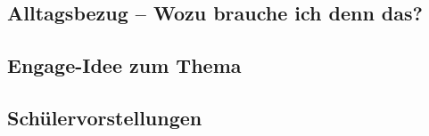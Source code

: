 

\subsection*{Alltagsbezug – Wozu brauche ich denn das?}




\subsection*{Engage-Idee zum Thema}



\subsection*{Schülervorstellungen}

